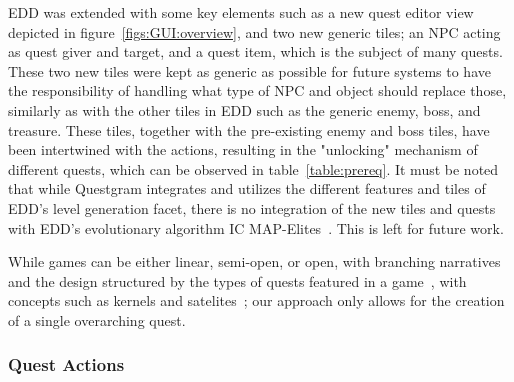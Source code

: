 

EDD was extended with some key elements such as a new quest editor view depicted in figure~\ref{figs:GUI:overview}, and two new generic tiles; an NPC acting as quest giver and target, and a quest item, which is the subject of many quests. These two new tiles were kept as generic as possible for future systems to have the responsibility of handling what type of NPC and object should replace those, similarly as with the other tiles in EDD such as the generic enemy, boss, and treasure. These tiles, together with the pre-existing enemy and boss tiles, have been intertwined with the actions, resulting in the "unlocking" mechanism of different quests, which can be observed in table~\ref{table:prereq}. It must be noted that while Questgram integrates and utilizes the different features and tiles of EDD's level generation facet, there is no integration of the new tiles and quests with EDD's evolutionary algorithm IC MAP-Elites~\cite{p8Alvarez2020-ICMAPE}. This is left for future work.

While games can be either linear, semi-open, or open, with branching narratives and the design structured by the types of quests featured in a game~\cite{p8aarseth2005hunt}, with concepts such as kernels and satelites~\cite{p8Aarseth2012-Narrativetheory}; our approach only allows for the creation of a single overarching quest.





\subsubsection{Quest Actions}


